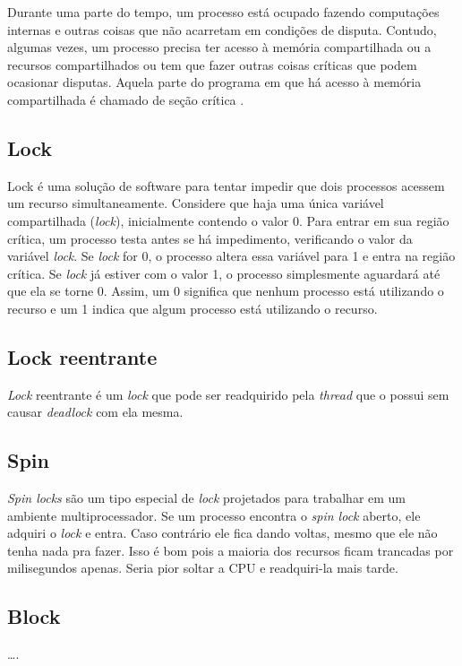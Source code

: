Durante uma parte do tempo, um processo está ocupado fazendo computações internas e outras coisas que não acarretam
em condições de disputa. Contudo, algumas vezes, um processo precisa ter acesso à memória compartilhada ou a recursos compartilhados ou tem que fazer outras coisas críticas que podem ocasionar disputas. Aquela parte do programa
em que há acesso à memória compartilhada é chamado de seção crítica \cite{tanen}.


\subsection{Lock}

Lock é uma solução de software para tentar impedir que dois processos acessem um recurso 
simultaneamente\cite{MCRT}. Considere que haja uma única variável compartilhada (\textit{lock}), inicialmente 
contendo o valor 0. Para entrar em sua região crítica, um processo testa antes se há 
impedimento, verificando o valor da variável \textit{lock}. Se \textit{lock} for 0, o processo altera essa 
variável para 1 e entra na região crítica. Se \textit{lock} já estiver com o valor 1, o processo 
simplesmente aguardará até que ela se torne 0. Assim, um 0 significa que nenhum processo 
está utilizando o recurso e um 1 indica que algum processo está utilizando o recurso. 


\subsection{Lock reentrante}

\textit{Lock} reentrante é um \textit{lock} que pode ser readquirido pela \textit{thread} que o possui sem causar \textit{deadlock} com ela mesma.

\subsection{Spin}

\textit{Spin locks} são um tipo especial de \textit{lock} projetados para trabalhar em um ambiente 
multiprocessador. Se um processo encontra o \textit{spin lock} aberto, ele adquiri o \textit{lock} e entra. 
Caso contrário ele fica dando voltas, mesmo que ele não tenha nada pra fazer. Isso é bom 
pois a maioria dos recursos ficam trancadas por milisegundos apenas. Seria pior soltar a 
CPU e readquiri-la mais tarde.

\subsection{Block}
….


